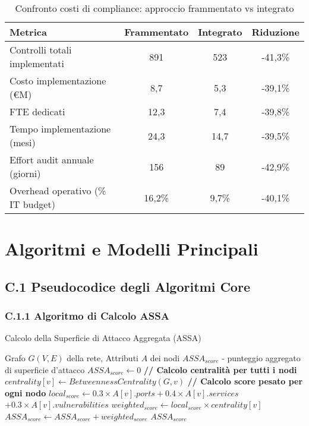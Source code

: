 \begin{table}[htbp]
\centering
\caption{Confronto costi di compliance: approccio frammentato vs integrato}
\label{tab:compliance_costs}
\begin{tabular}{lccc}
\toprule
\textbf{Metrica} & \textbf{Frammentato} & \textbf{Integrato} & \textbf{Riduzione} \\
\midrule
Controlli totali implementati & 891 & 523 & -41,3\% \\
Costo implementazione (€M) & 8,7 & 5,3 & -39,1\% \\
FTE dedicati & 12,3 & 7,4 & -39,8\% \\
Tempo implementazione (mesi) & 24,3 & 14,7 & -39,5\% \\
Effort audit annuale (giorni) & 156 & 89 & -42,9\% \\
Overhead operativo (\% IT budget) & 16,2\% & 9,7\% & -40,1\% \\
\bottomrule
\end{tabular}
\end{table}


\chapter{Algoritmi e Modelli Principali}
\label{app:algoritmi}

\newtheorem{theorem}{Teorema}

\section{C.1 Pseudocodice degli Algoritmi Core}

\subsection{C.1.1 Algoritmo di Calcolo ASSA}

\begin{algorithm}
\caption{Calcolo della Superficie di Attacco Aggregata (ASSA)}
\label{alg:assa}
\begin{algorithmic}
\Require Grafo $G(V,E)$ della rete, Attributi $A$ dei nodi
\Ensure $ASSA_{score}$ - punteggio aggregato di superficie d'attacco
\State $ASSA_{score} \gets 0$
\State \textbf{// Calcolo centralità per tutti i nodi}
    \State $centrality[v] \gets BetweennessCentrality(G, v)$
\EndFor
\State \textbf{// Calcolo score pesato per ogni nodo}
    \State $local_{score} \gets 0.3 \times A[v].ports + 0.4 \times A[v].services$
    \State \hspace{2.3cm} $+ 0.3 \times A[v].vulnerabilities$
    \State $weighted_{score} \gets local_{score} \times centrality[v]$
    \State $ASSA_{score} \gets ASSA_{score} + weighted_{score}$
\EndFor
\State \Return $ASSA_{score}$
\end{algorithmic}
\end{algorithm}

